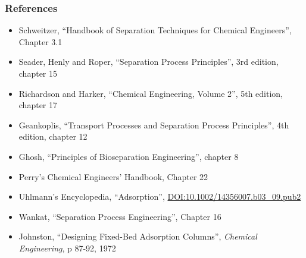 \begin{frame}\frametitle{References}
	\begin{itemize}
		\item	Schweitzer, ``Handbook of Separation Techniques for Chemical Engineers'', Chapter 3.1
		\item	Seader, Henly and Roper, ``Separation Process Principles'', 3rd edition, chapter 15
		\item	Richardson and Harker, ``Chemical Engineering, Volume 2'', 5th edition, chapter 17
		\item	Geankoplis, ``Transport Processes and Separation Process Principles'', 4th edition, chapter 12
		\item	Ghosh, ``Principles of Bioseparation Engineering'', chapter 8
		\item	Perry's Chemical Engineers' Handbook, Chapter 22
		\item	Uhlmann's Encyclopedia, ``Adsorption'',  \href{http://dx.doi.org/10.1002/14356007.b03\_09.pub2}{DOI:10.1002/14356007.b03\_09.pub2}
		\item	Wankat, ``Separation Process Engineering'', Chapter 16
		\item	Johnston, ``Designing Fixed-Bed Adsorption Columns'', \emph{Chemical Engineering}, p 87-92, 1972
	\end{itemize}
\end{frame}


